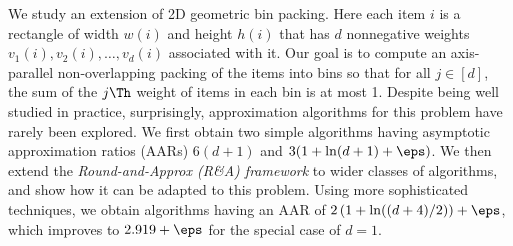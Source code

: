 We study an extension of 2D geometric bin packing.
Here each item $i$ is a rectangle of width $w(i)$ and height $h(i)$
that has $d$ nonnegative weights $v_1(i), v_2(i), \ldots, v_d(i)$ associated with it.
Our goal is to compute an axis-parallel non-overlapping packing of the items into bins so that
for all $j \in [d]$, the sum of the $j\Th$ weight of items in each bin is at most 1.
Despite being well studied in practice, surprisingly,
approximation algorithms for this problem have rarely been explored.
We first obtain two simple algorithms having asymptotic approximation ratios (AARs)
$6(d+1)$ and $3(1 + \ln(d+1) + \eps)$.
We then extend the \emph{Round-and-Approx (R\&A) framework}
\texorpdfstring{\cite{bansal2014binpacking}}{[Bansal-Khan, SODA'14]}
to wider classes of algorithms, and show how it can be adapted to this problem.
Using more sophisticated techniques, we obtain algorithms having
an AAR of $2\left(1+\ln((d+4)/2)\right)+\eps$,
which improves to $2.919+\eps$ for the special case of $d=1$.
